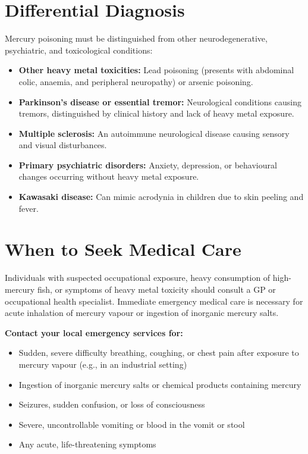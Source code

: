 \section*{Differential Diagnosis}
Mercury poisoning must be distinguished from other neurodegenerative, psychiatric, and toxicological conditions:

\begin{itemize}
    \item \textbf{Other heavy metal toxicities:} Lead poisoning (presents with abdominal colic, anaemia, and peripheral neuropathy) or arsenic poisoning.
    \item \textbf{Parkinson's disease or essential tremor:} Neurological conditions causing tremors, distinguished by clinical history and lack of heavy metal exposure.
    \item \textbf{Multiple sclerosis:} An autoimmune neurological disease causing sensory and visual disturbances.
    \item \textbf{Primary psychiatric disorders:} Anxiety, depression, or behavioural changes occurring without heavy metal exposure.
    \item \textbf{Kawasaki disease:} Can mimic acrodynia in children due to skin peeling and fever.
\end{itemize}

\section*{When to Seek Medical Care}
Individuals with suspected occupational exposure, heavy consumption of high-mercury fish, or symptoms of heavy metal toxicity should consult a GP or occupational health specialist. Immediate emergency medical care is necessary for acute inhalation of mercury vapour or ingestion of inorganic mercury salts.

\textbf{Contact your local emergency services for:}
\begin{itemize}
    \item Sudden, severe difficulty breathing, coughing, or chest pain after exposure to mercury vapour (e.g., in an industrial setting)
    \item Ingestion of inorganic mercury salts or chemical products containing mercury
    \item Seizures, sudden confusion, or loss of consciousness
    \item Severe, uncontrollable vomiting or blood in the vomit or stool
    \item Any acute, life-threatening symptoms
\end{itemize}

